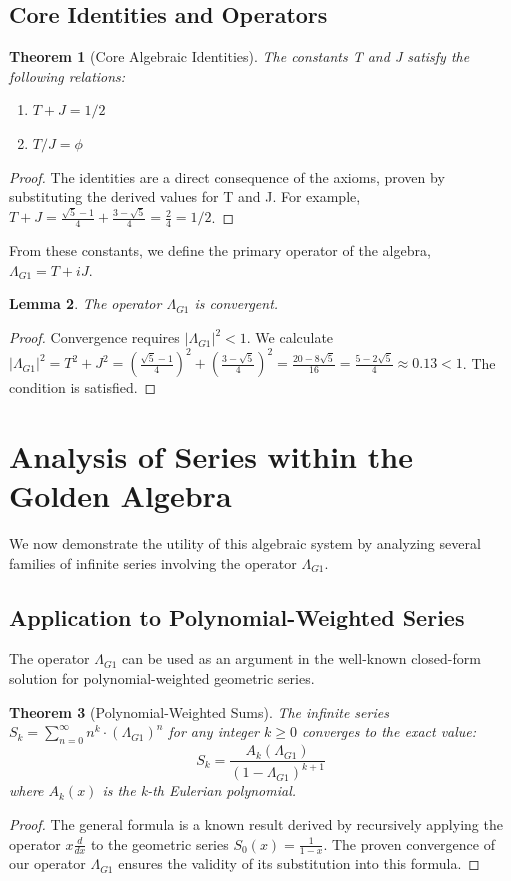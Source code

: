 \documentclass[12pt, letterpaper]{article}
\newtheorem{theorem}{Theorem}[section]
\newtheorem{lemma}[theorem]{Lemma}
\newcommand{\LambdaG}{\Lambda_{G1}}
\begin{document}
\subsection{Core Identities and Operators}
\begin{theorem}[Core Algebraic Identities]
The constants T and J satisfy the following relations:
\begin{enumerate}
    \item $T+J=1/2$ 
    \item $T/J=\phi$ 
\end{enumerate}
\end{theorem}
\begin{proof}
The identities are a direct consequence of the axioms, proven by substituting the derived values for T and J. For example, $T+J=\frac{\sqrt{5}-1}{4}+\frac{3-\sqrt{5}}{4}=\frac{2}{4}=1/2$.
\end{proof}

From these constants, we define the primary operator of the algebra, $\LambdaG = T+iJ$.

\begin{lemma}
The operator $\LambdaG$ is convergent.
\end{lemma}
\begin{proof}
Convergence requires $|\LambdaG|^2 < 1$. We calculate $|\LambdaG|^2 = T^2+J^2 = \left(\frac{\sqrt{5}-1}{4}\right)^2 + \left(\frac{3-\sqrt{5}}{4}\right)^2 = \frac{20-8\sqrt{5}}{16} = \frac{5-2\sqrt{5}}{4} \approx 0.13 < 1$. The condition is satisfied.
\end{proof}

\section{Analysis of Series within the Golden Algebra}
We now demonstrate the utility of this algebraic system by analyzing several families of infinite series involving the operator $\LambdaG$.

\subsection{Application to Polynomial-Weighted Series}
The operator $\LambdaG$ can be used as an argument in the well-known closed-form solution for polynomial-weighted geometric series.
\begin{theorem}[Polynomial-Weighted Sums]
The infinite series $S_k = \sum_{n=0}^{\infty} n^k \cdot (\LambdaG)^n$ for any integer $k \ge 0$ converges to the exact value: $$S_k = \frac{A_k(\LambdaG)}{(1-\LambdaG)^{k+1}}$$ where $A_k(x)$ is the k-th Eulerian polynomial.
\end{theorem}
\begin{proof}
The general formula is a known result derived by recursively applying the operator $x \frac{d}{dx}$ to the geometric series $S_0(x) = \frac{1}{1-x}$. The proven convergence of our operator $\LambdaG$ ensures the validity of its substitution into this formula.
\end{proof}
\end{document}
